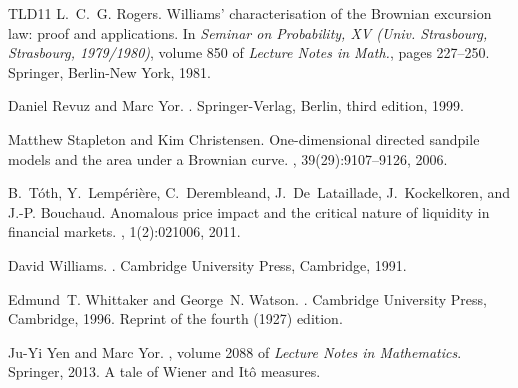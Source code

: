 \documentclass[11pt]{scrartcl}
\begin{document}
\begin{thebibliography}{TLD{\etalchar{+}}11}
L.~C.~G. Rogers.
\newblock Williams' characterisation of the {B}rownian excursion law: proof and
  applications.
\newblock In {\em Seminar on {P}robability, {XV} ({U}niv. {S}trasbourg,
  {S}trasbourg, 1979/1980)}, volume 850 of {\em Lecture Notes in Math.}, pages
  227--250. Springer, Berlin-New York, 1981.

Daniel Revuz and Marc Yor.
.
\newblock Springer-Verlag, Berlin, third edition, 1999.

Matthew Stapleton and Kim Christensen.
\newblock One-dimensional directed sandpile models and the area under a
  {B}rownian curve.
,
  39(29):9107--9126, 2006.

B.~T\'oth, Y.~Lemp\'eri\`ere, C.~Derembleand, J.~De~Lataillade, J.~Kockelkoren,
  and J.-P. Bouchaud.
\newblock Anomalous price impact and the critical nature of liquidity in
  financial markets.
, 1(2):021006, 2011.

David Williams.
.
\newblock Cambridge University Press, Cambridge, 1991.

Edmund~T. Whittaker and George~N. Watson.
.
\newblock Cambridge University Press, Cambridge, 1996.
\newblock Reprint of the fourth (1927) edition.

Ju-Yi Yen and Marc Yor.
, volume
  2088 of {\em Lecture Notes in Mathematics}.
\newblock Springer, 2013.
\newblock A tale of Wiener and It{\^o} measures.

\end{thebibliography}
\end{document}

